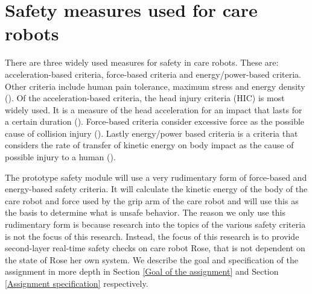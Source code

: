 \documentclass[12pt]{scrreprt}
\begin{document}
 \section{Safety measures used for care robots}
 \label{Safety in care robots}
There are three widely used measures for safety in care robots. These are: acceleration-based criteria,  force-based criteria and energy/power-based criteria. Other criteria include human pain tolerance, maximum stress and energy density (\cite{tadele}). Of the acceleration-based criteria, the head injury criteria (HIC) is most widely used. It is a measure of the head acceleration for an impact that lasts for a certain duration (\cite{hic}). Force-based criteria consider excessive force as the possible cause of collision injury (\cite{force}). Lastly energy/power based criteria is a criteria that considers the rate of transfer of kinetic energy on body impact as the cause of possible injury to a human (\cite{crucial_milestone}).
\par
The prototype safety module will use a very rudimentary form of force-based and energy-based safety criteria. It will calculate the kinetic energy of the body of the care robot and force used by the grip arm of the care robot and will use this as the basis to determine what is unsafe behavior. The reason we only use this rudimentary form is because research into the topics of the various safety criteria is not the focus of this research. Instead, the focus of this research is to provide second-layer real-time safety checks on care robot Rose, that is not dependent on the state of Rose her own system. We describe the goal and specification of the assignment in more depth in Section \ref{Goal of the assignment} and Section \ref{Assignment specification} respectively.
 
\end{document}
